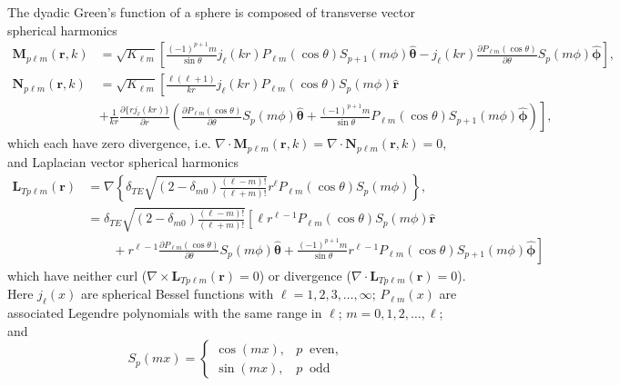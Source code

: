 \documentclass{article}
\begin{document}
The dyadic Green's function of a sphere is composed of transverse vector spherical harmonics
\begin{equation}
\begin{split}
\mathbf{M}_{p\ell m}(\mathbf{r},k) &= \sqrt{K_{\ell m}}\left[\frac{(-1)^{p + 1}m}{\sin\theta}j_\ell(kr)P_{\ell m}(\cos\theta)S_{p+1}(m\phi)\hat{\bm{\theta}} - j_\ell(kr)\frac{\partial P_{\ell m}(\cos\theta)}{\partial\theta}S_p(m\phi)\hat{\bm{\phi}}\right],\\[0.5em]
\mathbf{N}_{p\ell m}(\mathbf{r},k) &= \sqrt{K_{\ell m}}\left[\frac{\ell(\ell + 1)}{kr}j_\ell(kr)P_{\ell m}(\cos\theta)S_p(m\phi)\hat{\mathbf{r}}\right.\\
&+ \left.\frac{1}{kr}\frac{\partial\{rj_\ell(kr)\}}{\partial r}\left(\frac{\partial P_{\ell m}(\cos\theta)}{\partial\theta}S_p(m\phi)\hat{\bm{\theta}} + \frac{(-1)^{p+1}m}{\sin\theta}P_{\ell m}(\cos\theta)S_{p + 1}(m\phi)\hat{\bm{\phi}}\right)\right],
\end{split}
\end{equation}
which each have zero divergence, i.e. $\nabla\cdot\mathbf{M}_{p\ell m}(\mathbf{r},k) = \nabla\cdot\mathbf{N}_{p\ell m}(\mathbf{r},k) = 0$,
and Laplacian vector spherical harmonics
\begin{equation}
\begin{split}
\mathbf{L}_{Tp\ell m}(\mathbf{r}) &= \nabla\left\{\delta_{TE}\sqrt{(2 - \delta_{m0})\frac{(\ell - m)!}{(\ell + m)!}}r^\ell P_{\ell m}(\cos\theta)S_p(m\phi)\right\},\\
&= \delta_{TE}\sqrt{(2 - \delta_{m0})\frac{(\ell - m)!}{(\ell + m)!}}\left[\ell r^{\ell - 1}P_{\ell m}(\cos\theta)S_p(m\phi)\hat{\mathbf{r}}\right.\\
&\qquad+ \left. r^{\ell - 1}\frac{\partial P_{\ell m}(\cos\theta)}{\partial \theta}S_p(m\phi)\hat{\bm{\theta}} + \frac{(-1)^{p+1}m}{\sin\theta}r^{\ell - 1}P_{\ell m}(\cos\theta)S_{p+1}(m\phi)\hat{\bm{\phi}} \right]
\end{split}
\end{equation}
which have neither curl ($\nabla\times\mathbf{L}_{Tp\ell m}(\mathbf{r}) = 0$) or divergence ($\nabla\cdot\mathbf{L}_{Tp\ell m}(\mathbf{r}) = 0$). Here $j_\ell(x)$ are spherical Bessel functions with $\ell = 1,2,3,\ldots,\infty$; $P_{\ell m}(x)$ are associated Legendre polynomials with the same range in $\ell$; $m = 0,1,2,\ldots,\ell$; and 
\begin{equation}
S_p(mx) = 
\begin{cases}
\cos(mx), & p\;\;\mathrm{even},\\
\sin(mx), & p \;\;\mathrm{odd}
\end{cases}
\end{equation}
\end{document}
